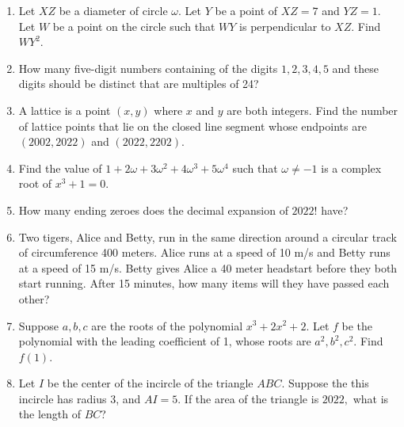 \documentclass[11pt,paper=letter]{scrartcl}
\begin{document}
\begin{enumerate}[label=\textbf{\arabic*}.]
    \item Let $XZ$ be a diameter of circle $\omega$. Let $Y$ be a point of $XZ=7$ and $YZ=1.$ Let $W$ be a point on the circle such that $WY$ is perpendicular to $XZ$. Find $WY^2$.
    
    
    \item How many five-digit numbers containing of the digits $1,2,3,4,5$ and these digits should be distinct that are multiples of 24?
    
    
    \item A lattice is a point $(x,y)$ where $x$ and $y$ are both integers. Find the number of lattice points that lie on the closed line segment whose endpoints are $(2002, 2022)$ and $(2022, 2202).$
    
    
    \item Find the value of $1 + 2\omega + 3\omega^2 + 4\omega^3 + 5\omega^4$ such that $\omega \neq -1$ is a complex root of $x^3 +1 = 0$.
    
    
    \item How many ending zeroes does the decimal expansion of $2022!$ have?
    


   \item Two tigers, Alice and Betty, run in the same direction around a circular track of circumference 400 meters. Alice runs at a speed of 10 m/s and Betty runs at a speed of 15 m/s. Betty gives Alice a 40 meter headstart before they both start running. After 15 minutes, how many items will they have passed each other?

    
   \item Suppose $a,b,c$ are the roots of the polynomial $x^3 +2x^2 + 2$. Let $f$ be the polynomial with the leading coefficient of 1, whose roots are $a^2, b^2, c^2$. Find $f(1).$
   
   
   \item Let $I$ be the center of the incircle of the triangle $ABC.$ Suppose the this incircle has radius 3, and $AI =5.$ If the area of the triangle is $2022,$ what is the length of $BC$?
   

\end{enumerate}
\end{document}
